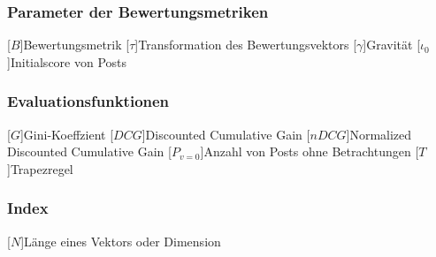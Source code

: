 \subsubsection*{Parameter der Bewertungsmetriken}
\begin{acronym}[LONGEST]
[\ensuremath{B}]{Bewertungsmetrik}
[\ensuremath{\tau}]{Transformation des Bewertungsvektors}
[\ensuremath{\gamma}]{Gravität}
[\ensuremath{\iota_0}]{Initialscore von Posts}
\end{acronym}

\subsubsection*{Evaluationsfunktionen}
\begin{acronym}[LONGEST]
	[\ensuremath{G}]{Gini-Koeffzient}
	[\ensuremath{DCG}]{Discounted Cumulative Gain}
	[\ensuremath{nDCG}]{Normalized Discounted Cumulative Gain}
	[\ensuremath{P_{v=0}}]{Anzahl von Posts ohne Betrachtungen}
	[\ensuremath{T}]{Trapezregel}
\end{acronym}

\subsubsection*{Index}
\begin{acronym}[LONGEST]
[\ensuremath{N}]{Länge eines Vektors oder Dimension}
\end{acronym}
